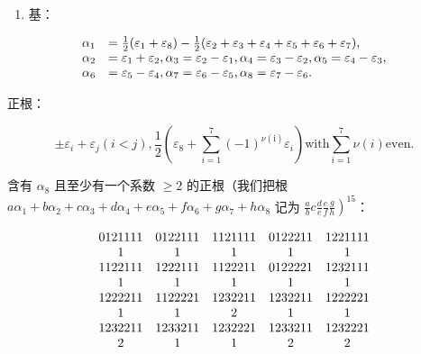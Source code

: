 \begin{enumerate}
\def\labelenumi{(\Roman{enumi})}
\setcounter{enumi}{1}
\tightlist
\item
  基：
\end{enumerate}

\[
\begin{array}{r l} \alpha_ {1} & = \frac {1}{2} (\varepsilon_ {1} + \varepsilon_ {8}) - \frac {1}{2} (\varepsilon_ {2} + \varepsilon_ {3} + \varepsilon_ {4} + \varepsilon_ {5} + \varepsilon_ {6} + \varepsilon_ {7}), \\ \alpha_ {2} & = \varepsilon_ {1} + \varepsilon_ {2}, \alpha_ {3} = \varepsilon_ {2} - \varepsilon_ {1}, \alpha_ {4} = \varepsilon_ {3} - \varepsilon_ {2}, \alpha_ {5} = \varepsilon_ {4} - \varepsilon_ {3}, \\ \alpha_ {6} & = \varepsilon_ {5} - \varepsilon_ {4}, \alpha_ {7} = \varepsilon_ {6} - \varepsilon_ {5}, \alpha_ {8} = \varepsilon_ {7} - \varepsilon_ {6}. \end{array}
\]

正根：

\[
\pm \varepsilon_ {i} + \varepsilon_ {j} (i <   j), \frac {1}{2} (\varepsilon_ {8} + \sum_ {i = 1} ^ {7} (- 1) ^ {\nu (\mathrm{i})} \varepsilon_ {i}) \text {with} \sum_ {i = 1} ^ {7} \nu (i) \text {even}.
\]

含有 \(\alpha_{8}\) 且至少有一个系数 \(\geqslant 2\) 的正根（我们把根 \(a\alpha_{1} + b\alpha_{2} + c\alpha_{3} + d\alpha_{4} + e\alpha_{5} + f\alpha_{6} + g\alpha_{7} + h\alpha_{8}\) 记为 \(\left.\frac{a}{b}c\frac{d}{e}\frac{e}{f}\frac{g}{h}\right)^{15}\)：

\[
\begin{array}{c c c c c} 0   1   2   1   1   1   1 & 0   1   2   2   1   1   1 & 1   1   2   1   1   1   1 & 0   1   2   2   2   1   1 & 1   2   2   1   1   1   1 \\ 1 & 1 & 1 & 1 & 1 \\ 1   1   2   2   1   1   1 & 1   2   2   2   1   1   1 & 1   1   2   2   2   1   1 & 0   1   2   2   2   2   1 & 1   2   3   2   1   1   1 \\ 1 & 1 & 1 & 1 & 1 \\ 1   2   2   2   2   1   1 & 1   1   2   2   2   2   1 & 1   2   3   2   2   1   1 & 1   2   3   2   2   1   1 & 1   2   2   2   2   2   1 \\ 1 & 1 & 2 & 1 & 1 \\ 1   2   3   2   2   1   1 & 1   2   3   3   2   1   1 & 1   2   3   2   2   2   1 & 1   2   3   3   2   1   1 & 1   2   3   2   2   2   1 \\ 2 & 1 & 1 & 2 & 2 \end{array}
\]

